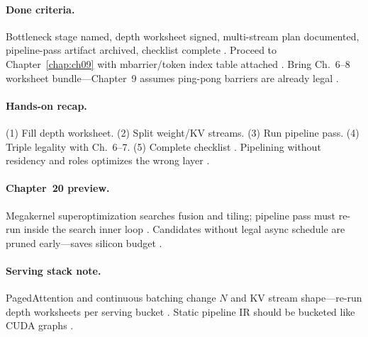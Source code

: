 \paragraph{Done criteria.}
Bottleneck stage named, depth worksheet signed, multi-stream plan documented, pipeline-pass artifact archived, checklist complete \citep{yirage2026,shah2024flashattention3,patel2025llminference,taxbreak2026,memoryfloor2026,chen2020compilerbasedhardw}.
Proceed to Chapter~\ref{chap:ch09} with mbarrier/token index table attached \citep{semianalysis2024tma,dao2022flashattention}.
Bring Ch.~6--8 worksheet bundle---Chapter~9 assumes ping-pong barriers are already legal \citep{yirage2026,shah2024flashattention3,dao2022flashattention,mpk2025,chen2020compilerbasedhardw}.

\paragraph{Hands-on recap.}
(1) Fill depth worksheet. (2) Split weight/KV streams. (3) Run pipeline pass. (4) Triple legality with Ch.~6--7. (5) Complete checklist \citep{taxbreak2026,shah2024flashattention3,yirage2026,patel2025llminference,mpk2025,amd2024xdna,nvidia2022hopper,semianalysis2024tma,dao2022flashattention,memoryfloor2026,wu2024mirage,nvidia2024cudagraphs,kwon2023vllm,dlbook,chen2020compilerbasedhardw,amd2024aie,dao2023flashdecoding}.
Pipelining without residency and roles optimizes the wrong layer \citep{dao2022flashattention,yirage2026,memoryfloor2026}.

\paragraph{Chapter~20 preview.}
Megakernel superoptimization searches fusion and tiling; pipeline pass must re-run inside the search inner loop \citep{mpk2025,wu2024mirage,yirage2026}.
Candidates without legal async schedule are pruned early---saves silicon budget \citep{chen2020compilerbasedhardw,taxbreak2026,patel2025llminference}.

\paragraph{Serving stack note.}
PagedAttention and continuous batching change $N$ and KV stream shape---re-run depth worksheets per serving bucket \citep{kwon2023vllm,dao2023flashdecoding,patel2025llminference}.
Static pipeline IR should be bucketed like CUDA graphs \citep{nvidia2024cudagraphs,yirage2026,shah2024flashattention3}.

